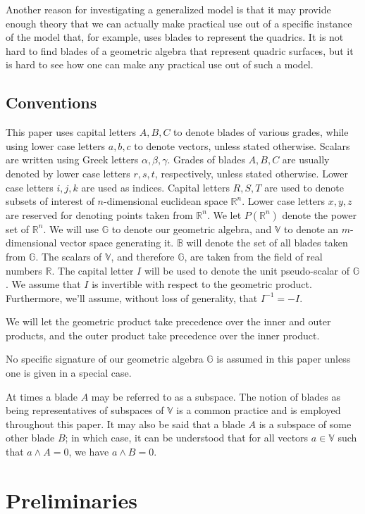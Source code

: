 \documentclass{birkjour}
\theoremstyle{definition}
\theoremstyle{remark}
\numberwithin{equation}{section}
\newcommand{\R}{\mathbb{R}}
\newcommand{\B}{\mathbb{B}}
\newcommand{\G}{\mathbb{G}}
\newcommand{\V}{\mathbb{V}}
\begin{document}
Another reason for investigating a generalized model is that it may provide enough theory that
we can actually make practical use out of a specific instance of the model that, for example,
uses blades to represent the quadrics.  It is not hard to find blades of a geometric algebra that
represent quadric surfaces, but it is hard to see how one can make any practical use out of such a model.

\subsection{Conventions}

This paper uses capital letters $A,B,C$ to denote blades of various grades,
while using lower case letters $a,b,c$ to denote vectors, unless stated otherwise.  Scalars are written
using Greek letters $\alpha,\beta,\gamma$.  Grades of blades $A,B,C$ are usually
denoted by lower case letters $r,s,t$, respectively, unless stated otherwise.  Lower case letters $i,j,k$ are
used as indices.  Capital letters $R,S,T$
are used to denote subsets of interest of $n$-dimensional euclidean space $\R^n$.
Lower case letters $x,y,z$ are reserved for denoting points taken from $\R^n$.  We
let $P(\R^n)$ denote the power set of $\R^n$.
We will use $\G$ to denote our geometric algebra, and $\V$ to denote an $m$-dimensional vector
space generating it.  $\B$ will denote the set of all blades taken from $\G$.  The
scalars of $\V$, and therefore $\G$, are taken from the field of real numbers $\R$.
The capital letter $I$ will be used to denote the unit pseudo-scalar of $\G$.  We assume
that $I$ is invertible with respect to the geometric product.  Furthermore, we'll assume, without
loss of generality, that $I^{-1}=-I$.

We will let the geometric product take precedence over the inner and outer products,
and the outer product take precedence over the inner product.

No specific signature of our geometric algebra $\G$ is assumed in this paper unless
one is given in a special case.

At times a blade $A$ may be referred to as a subspace.  The notion of blades as being
representatives of subspaces of $\V$ is a common practice and is employed throughout this paper.
It may also be said that a blade $A$ is a subspace of some other blade $B$; in which case,
it can be understood that for all vectors $a\in\V$ such that $a\wedge A=0$, we have $a\wedge B=0$.

\section{Preliminaries}
\end{document}

